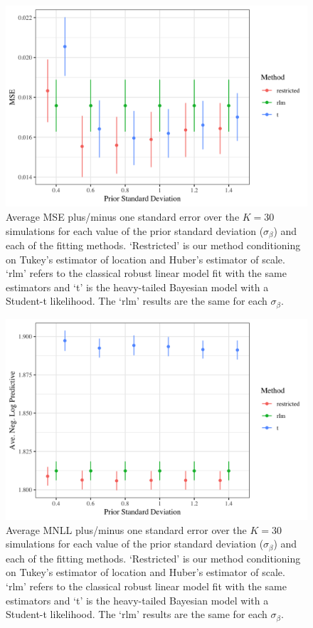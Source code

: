 \documentclass[ba]{imsart}
\begin{document}
\begin{figure}[t]
\centering
\includegraphics[width = 5in]{mse_sim_many_p.png}
\caption{Average MSE plus/minus one standard error over the $K = 30$ simulations for each value of the prior standard deviation ($\sigma_{\beta}$) and each of the fitting methods. `Restricted' is our method conditioning on Tukey's estimator of location and Huber's estimator of scale. `rlm' refers to the classical robust linear model fit with the same estimators and `t' is the heavy-tailed Bayesian model with a Student-t likelihood. The `rlm' results are the same for each $\sigma_{\beta}$.}
\label{mseSimMany}
\end{figure}

\begin{figure}[t]
\centering
\includegraphics[width = 5in]{negll_sim_many_p.png}
\caption{Average MNLL plus/minus one standard error over the $K = 30$ simulations for each value of the prior standard deviation ($\sigma_{\beta}$) and each of the fitting methods. `Restricted' is our method conditioning on Tukey's estimator of location and Huber's estimator of scale. `rlm' refers to the classical robust linear model fit with the same estimators and `t' is the heavy-tailed Bayesian model with a Student-t likelihood. The `rlm' results are the same for each $\sigma_{\beta}$.}
\label{negllSimMany}
\end{figure}
\end{document}

